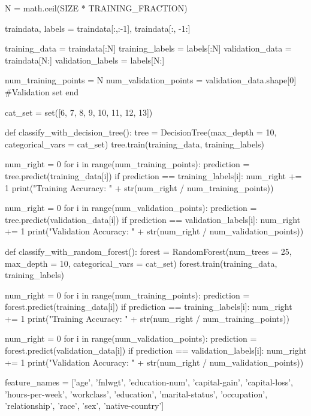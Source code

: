 \documentclass{article}
\begin{document}
\begin{python}
N = math.ceil(SIZE * TRAINING_FRACTION)

traindata, labels = traindata[:,:-1], traindata[:, -1:]

training_data = traindata[:N]
training_labels = labels[:N]
validation_data = traindata[N:]
validation_labels = labels[N:]

num_training_points = N
num_validation_points = validation_data.shape[0]
#Validation set end

cat_set = set([6, 7, 8, 9, 10, 11, 12, 13])

def classify_with_decision_tree():
    tree = DecisionTree(max_depth = 10, categorical_vars = cat_set)
    tree.train(training_data, training_labels)

    num_right = 0
    for i in range(num_training_points):
        prediction = tree.predict(training_data[i])
        if prediction == training_labels[i]:
            num_right += 1
    print("Training Accuracy: " + str(num_right / num_training_points))

    num_right = 0
    for i in range(num_validation_points):
        prediction = tree.predict(validation_data[i])
        if prediction == validation_labels[i]:
            num_right += 1
    print("Validation Accuracy: " + str(num_right / num_validation_points))

def classify_with_random_forest():
    forest = RandomForest(num_trees = 25, max_depth = 10, categorical_vars = cat_set)
    forest.train(training_data, training_labels)

    num_right = 0
    for i in range(num_training_points):
        prediction = forest.predict(training_data[i])
        if prediction == training_labels[i]:
            num_right += 1
    print("Training Accuracy: " + str(num_right / num_training_points))

    num_right = 0
    for i in range(num_validation_points):
        prediction = forest.predict(validation_data[i])
        if prediction == validation_labels[i]:
            num_right += 1
    print("Validation Accuracy: " + str(num_right / num_validation_points))

feature_names = ['age', 'fnlwgt', 'education-num', 'capital-gain', 'capital-loss',
        'hours-per-week', 'workclass', 'education', 'marital-status', 'occupation',
        'relationship', 'race', 'sex', 'native-country']


\end{python}
\end{document}
